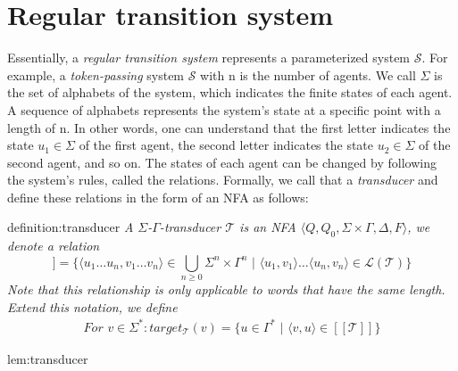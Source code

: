 \section{Regular transition system}\label{section:rts}
Essentially, a \textit{regular transition system} represents a parameterized system $\mathcal{S}$.
For example, a \textit{token-passing} system $\mathcal{S}$ with n is the number
of agents. We call $\Sigma$ is the set of alphabets of the system, which indicates the finite states of
each agent. 
A sequence of alphabets represents the system's state at a specific point with a length of n.
In other words, one can understand that the first letter indicates the state $u_1 \in \Sigma$ of the first agent, 
the second letter indicates the state $u_2 \in \Sigma$ of the second agent, and so on.
The states of each agent can be changed by following the system's rules,
called the relations. Formally, we call that a \textit{transducer} and define these relations in the form of an NFA as follows:
\begin{theo}[Transducer]{definition:transducer}
    \textit{
        A $\Sigma$-$\Gamma$-\textit{transducer} $\mathcal{T}$ is an \textit{NFA} 
        $\langle Q, Q_0, \Sigma \times \Gamma, \Delta, F \rangle$,
        we denote a relation 
        \begin{equation*}
          [[\mathcal{T}]] = \lbrace \langle u_1 \dots u_n, v_1 \dots v_n \rangle \in \bigcup_{n \geq 0} \Sigma^{n} \times \Gamma^{n} 
          \,\,|\,\, \langle u_1, v_1 \rangle \dots \langle u_n, v_n \rangle \in \mathcal{L}(\mathcal{T}) \rbrace 
        \end{equation*}
        Note that this relationship is only applicable to words that have the same length.
        Extend this notation, we define
        \begin{align*} 
            For \,\, v \in \Sigma^*: target_{\mathcal{T}}(v) = \lbrace u \in \Gamma^*\,\, | \,\, \langle v,u \rangle \in [[\mathcal{T}]] \rbrace 
        \end{align*}
    }
\end{theo}
\begin{lem}{lem:transducer}
\end{lem}


